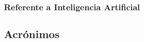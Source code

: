 \begin{enumerate}
		\newpage
		
		
	\subsubsection{Referente a Inteligencia Artificial}
		
		
		
\end{enumerate}




\newpage

\subsection{Acrónimos}
\label{sec:acronimos}

\begin{description}
	

\end{description}
